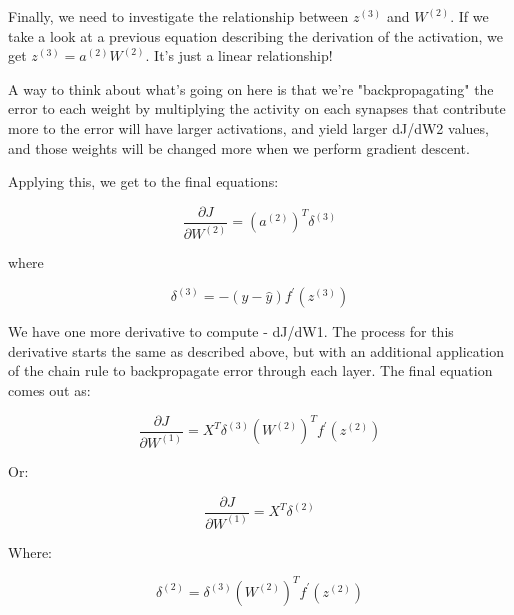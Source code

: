 \documentclass[]{article}
\begin{document}
Finally, we need to investigate the relationship between $z^{(3)}$ and $W^({2})$. If we take a look at a previous equation describing the derivation of the activation, we get $z^{(3)} = a^{(2)}W^{(2)}$. It's just a linear relationship!

A way to think about what's going on here is that we're "backpropagating" the error to each weight by multiplying the activity on each synapses that contribute more to the error will have larger activations, and yield larger dJ/dW2 values, and those weights will be changed more when we perform gradient descent. 

Applying this, we get to the final equations:

\begin{equation}
\frac{\partial J}{\partial W^{(2)}} = 
(a^{(2)})^T\delta^{(3)}\tag{6}
\end{equation}

where

\begin{equation}
\delta^{(3)} = -(y-\hat{y}) f^\prime(z^{(3)}) 
\end{equation}

We have one more derivative to compute - dJ/dW1. The process for this derivative starts the same as described above, but with an additional application of the chain rule to backpropagate error through each layer. The final equation comes out as: 

\begin{equation}
\frac{\partial J}{\partial W^{(1)}} = 
X^{T}
\delta^{(3)} 
(W^{(2)})^{T}
f^\prime(z^{(2)})
\end{equation}

Or: 

\begin{equation}
\frac{\partial J}{\partial W^{(1)}} = 
X^{T}\delta^{(2)} \tag{7}
\end{equation}

Where: 

\begin{equation}
\delta^{(2)} = \delta^{(3)} 
(W^{(2)})^{T}
f^\prime(z^{(2)})
\end{equation}
\end{document}
